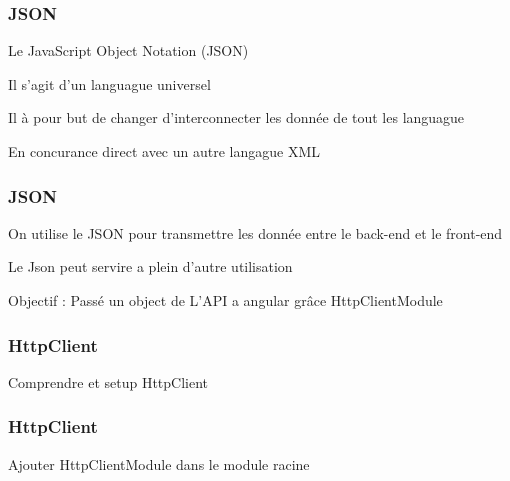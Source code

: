 \documentclass[10pt]{beamer}
\begin{document}

    \begin{frame}
        \frametitle{JSON}

        Le JavaScript Object Notation (JSON) \newline \newline

        Il s'agit d'un languague universel \newline \newline

        Il à pour but de changer d'interconnecter les donnée de tout les languague \newline \newline

        En concurance direct avec un autre langague XML \newline \newline



    \end{frame}

    \begin{frame}
        \frametitle{JSON}

        On utilise le JSON pour transmettre les donnée entre le back-end et le front-end \newline \newline

        Le Json peut servire a plein d'autre utilisation \newline \newline

        Objectif : Passé un object de L'API a angular grâce HttpClientModule \newline \newline

    \end{frame}


    \begin{frame}
        \frametitle{HttpClient}

        Comprendre et setup HttpClient

    \end{frame}

    \begin{frame}
        \frametitle{HttpClient}

        Ajouter HttpClientModule dans le module racine

    \end{frame}
\end{document}
